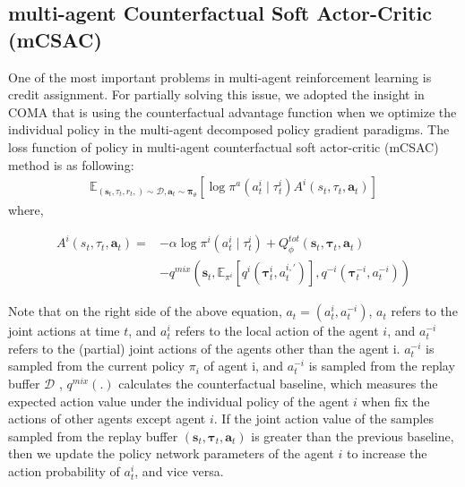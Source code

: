 \documentclass[runningheads]{llncs}
\begin{document}
\subsection{multi-agent Counterfactual Soft Actor-Critic (mCSAC)}
One of the most important problems in multi-agent reinforcement learning is credit assignment. For partially solving this issue, we adopted the insight in COMA that is using the counterfactual advantage function when we optimize the individual policy in the multi-agent decomposed policy gradient paradigms. The loss function of policy in multi-agent  counterfactual soft actor-critic (mCSAC) method is as following:
\begin{align}
	\mathbb{E}_{\left(\boldsymbol{s}_{t},\tau_{t}, r_{t}, \right) \sim \mathcal{D},  \boldsymbol{a}_{t}\sim {\boldsymbol{\pi}_{\theta}}}\left[
	\log \pi^{a}\left(a^{i}_{t} \mid \tau^{i}_{t}\right)  A^{i}(s_t, \tau_{t},\mathbf{a}_{t})\right]
\end{align}
where,
\begin{small}
	\begin{align}
		A^{i}(s_t, \tau_{t},\mathbf{a}_{t})=&-\alpha \log \pi^{i}\left(a^{i}_{t} \mid \tau^{i}_{t}\right)+ Q^{t o t}_{\phi}\left(\boldsymbol{s}_{t},\boldsymbol{\tau}_{t}, \boldsymbol{a}_{t} \right)\\
		&-q^{mix}\left(\boldsymbol{s}_{t},\mathbb{E}_{{\pi}^{i}} \left[ q^{i}\left(\boldsymbol{\tau}^{i}_{t}, a^{i,{\prime}}_{t}\right)\right],
		q^{-i}\left(\boldsymbol{\tau}^{-i}_{t}, a^{-i}_{t}\right)
		\right)
\end{align}
\end{small}


Note that on the right side of the above equation, $a_{t}=\left(a^{i}_t, a^{-i}_t\right)$, $a_{t}$ refers to the joint actions at time $t$, and $a^{i}_t$ refers to the local action of the agent $i$, and $a^{-i}_t$ refers to the (partial) joint actions of the agents other than the agent i. $a_{t}^{-i}$ is sampled from the current policy $\pi_i$ of agent i, and $a_{t}^{-i}$ is sampled from the replay buffer $\mathcal{D}$ ,
$q^{mix}\left(.\right)$  calculates the counterfactual baseline, which measures the expected action value under the individual policy of the agent $i$ when fix the actions of other agents except agent $i$. If the joint action value of the samples sampled from the replay buffer 
$\left( \boldsymbol{s}_{t},\boldsymbol{\tau}_{t}, \boldsymbol{a}_{t} \right)$ 
is greater than the previous baseline, then we update the policy network parameters of the agent $i$ to increase the action probability of $a^{i}_t$, and vice versa.
\end{document}

